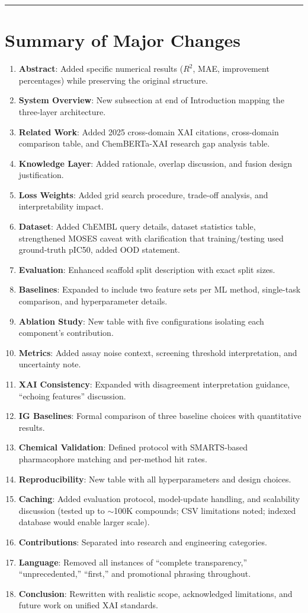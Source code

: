 \documentclass[12pt]{article}
\begin{document}
\bigskip
\hrule
\bigskip

\section*{Summary of Major Changes}

\begin{enumerate}[leftmargin=*]
\item \textbf{Abstract}: Added specific numerical results ($R^2$, MAE, improvement percentages) while preserving the original structure.
\item \textbf{System Overview}: New subsection at end of Introduction mapping the three-layer architecture.
\item \textbf{Related Work}: Added 2025 cross-domain XAI citations, cross-domain comparison table, and ChemBERTa-XAI research gap analysis table.
\item \textbf{Knowledge Layer}: Added rationale, overlap discussion, and fusion design justification.
\item \textbf{Loss Weights}: Added grid search procedure, trade-off analysis, and interpretability impact.
\item \textbf{Dataset}: Added ChEMBL query details, dataset statistics table, strengthened MOSES caveat with clarification that training/testing used ground-truth pIC50, added OOD statement.
\item \textbf{Evaluation}: Enhanced scaffold split description with exact split sizes.
\item \textbf{Baselines}: Expanded to include two feature sets per ML method, single-task comparison, and hyperparameter details.
\item \textbf{Ablation Study}: New table with five configurations isolating each component's contribution.
\item \textbf{Metrics}: Added assay noise context, screening threshold interpretation, and uncertainty note.
\item \textbf{XAI Consistency}: Expanded with disagreement interpretation guidance, ``echoing features'' discussion.
\item \textbf{IG Baselines}: Formal comparison of three baseline choices with quantitative results.
\item \textbf{Chemical Validation}: Defined protocol with SMARTS-based pharmacophore matching and per-method hit rates.
\item \textbf{Reproducibility}: New table with all hyperparameters and design choices.
\item \textbf{Caching}: Added evaluation protocol, model-update handling, and scalability discussion (tested up to $\sim$100K compounds; CSV limitations noted; indexed database would enable larger scale).
\item \textbf{Contributions}: Separated into research and engineering categories.
\item \textbf{Language}: Removed all instances of ``complete transparency,'' ``unprecedented,'' ``first,'' and promotional phrasing throughout.
\item \textbf{Conclusion}: Rewritten with realistic scope, acknowledged limitations, and future work on unified XAI standards.
\end{enumerate}
\end{document}
